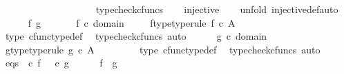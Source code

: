 \begin{isabellebody}
\ \ \ \ \ \ \ \ \ \ \ \ \ \ \ \ \ \ \isamarkupfalse%
\ typecheck{\isacharunderscore}{\kern0pt}cfuncs\isanewline
\ \ \isamarkupfalse%
\ {\isachardoublequoteopen}injective\ {\isasymphi}{\isachardoublequoteclose}\isanewline
\ \ \isamarkupfalse%
{\isacharparenleft}{\kern0pt}unfold\ injective{\isacharunderscore}{\kern0pt}def{\isacharcomma}{\kern0pt}auto{\isacharparenright}{\kern0pt}\isanewline
\ \ \ \ \isamarkupfalse%
\ f\ g\ \isanewline
\ \ \ \ \isamarkupfalse%
\ {\isachardoublequoteopen}f\ {\isasymin}\isactrlsub c\ domain\ {\isasymphi}{\isachardoublequoteclose}\ \isamarkupfalse%
\ \isamarkupfalse%
\ f{\isacharunderscore}{\kern0pt}type{\isacharbrackleft}{\kern0pt}type{\isacharunderscore}{\kern0pt}rule{\isacharbrackright}{\kern0pt}{\isacharcolon}{\kern0pt}\ {\isachardoublequoteopen}f\ {\isasymin}\isactrlsub c\ A\isactrlbsup {\isasymOmega}\isactrlesup {\isachardoublequoteclose}\ \isanewline
\ \ \ \ \ \ \isamarkupfalse%
\ {\isasymphi}{\isacharunderscore}{\kern0pt}type\ cfunc{\isacharunderscore}{\kern0pt}type{\isacharunderscore}{\kern0pt}def\ \isamarkupfalse%
\ {\isacharparenleft}{\kern0pt}typecheck{\isacharunderscore}{\kern0pt}cfuncs{\isacharcomma}{\kern0pt}\ auto{\isacharparenright}{\kern0pt}\isanewline
\ \ \ \ \isamarkupfalse%
\ {\isachardoublequoteopen}g\ {\isasymin}\isactrlsub c\ domain\ {\isasymphi}{\isachardoublequoteclose}\ \isamarkupfalse%
\ \isamarkupfalse%
\ g{\isacharunderscore}{\kern0pt}type{\isacharbrackleft}{\kern0pt}type{\isacharunderscore}{\kern0pt}rule{\isacharbrackright}{\kern0pt}{\isacharcolon}{\kern0pt}\ {\isachardoublequoteopen}g\ {\isasymin}\isactrlsub c\ A\isactrlbsup {\isasymOmega}\isactrlesup {\isachardoublequoteclose}\ \isanewline
\ \ \ \ \ \ \isamarkupfalse%
\ {\isasymphi}{\isacharunderscore}{\kern0pt}type\ cfunc{\isacharunderscore}{\kern0pt}type{\isacharunderscore}{\kern0pt}def\ \isamarkupfalse%
\ {\isacharparenleft}{\kern0pt}typecheck{\isacharunderscore}{\kern0pt}cfuncs{\isacharcomma}{\kern0pt}\ auto{\isacharparenright}{\kern0pt}\isanewline
\ \ \ \ \isamarkupfalse%
\ eqs{\isacharcolon}{\kern0pt}\ {\isachardoublequoteopen}{\isasymphi}\ {\isasymcirc}\isactrlsub c\ f\ {\isacharequal}{\kern0pt}\ {\isasymphi}\ {\isasymcirc}\isactrlsub c\ g{\isachardoublequoteclose}\isanewline
\ \ \ \ \isamarkupfalse%
\ {\isachardoublequoteopen}f\ {\isacharequal}{\kern0pt}\ g{\isachardoublequoteclose}\isanewline

\end{isabellebody}
